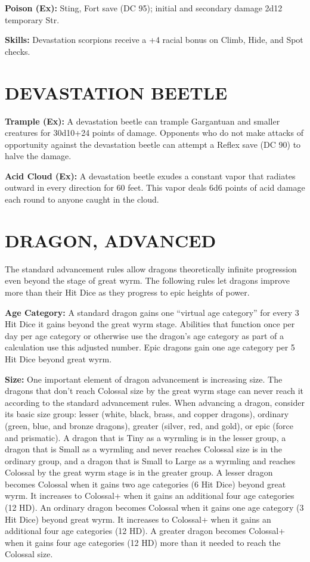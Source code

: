 \documentclass{article}
\begin{document}
\textbf{Poison (Ex):} Sting, Fort save (DC 95); initial and secondary damage 2d12 
temporary Str. 

\textbf{Skills:} Devastation scorpions receive a +4 racial bonus on Climb, Hide, 
and Spot checks. 

\section*{DEVASTATION BEETLE }

\textbf{Trample (Ex):} A devastation beetle can trample Gargantuan and smaller 
creatures for 30d10+24 points of damage. Opponents who do not make attacks of opportunity 
against the devastation beetle can attempt a Reflex save (DC 90) to halve the damage. 

\textbf{Acid Cloud (Ex):} A devastation beetle exudes a constant vapor that radiates 
outward in every direction for 60 feet. This vapor deals 6d6 points of acid damage 
each round to anyone caught in the cloud.

\vspace{12pt}
\section*{{\LARGE{}DRAGON, ADVANCED }}

The standard advancement rules allow dragons theoretically infinite progression 
even beyond the stage of great wyrm. The following rules let dragons improve more 
than their Hit Dice as they progress to epic heights of power. 

\vspace{12pt}
\textbf{Age Category:} A standard dragon gains one ``virtual age category'' for 
every 3 Hit Dice it gains beyond the great wyrm stage. Abilities that function 
once per day per age category or otherwise use the dragon's age category as part 
of a calculation use this adjusted number. Epic dragons gain one age category per 
5 Hit Dice beyond great wyrm. 

\vspace{12pt}
\textbf{Size: }One important element of dragon advancement is increasing size. 
The dragons that don't reach Colossal size by the great wyrm stage can never reach 
it according to the standard advancement rules. When advancing a dragon, consider 
its basic size group: lesser (white, black, brass, and copper dragons), ordinary 
(green, blue, and bronze dragons), greater (silver, red, and gold), or epic (force 
and prismatic). A dragon that is Tiny as a wyrmling is in the lesser group, a dragon 
that is Small as a wyrmling and never reaches Colossal size is in the ordinary 
group, and a dragon that is Small to Large as a wyrmling and reaches Colossal by 
the great wyrm stage is in the greater group. A lesser dragon becomes Colossal 
when it gains two age categories (6 Hit Dice) beyond great wyrm. It increases to 
Colossal+ when it gains an additional four age categories (12 HD). An ordinary 
dragon becomes Colossal when it gains one age category (3 Hit Dice) beyond great 
wyrm. It increases to Colossal+ when it gains an additional four age categories 
(12 HD). A greater dragon becomes Colossal+ when it gains four age categories (12 
HD) more than it needed to reach the Colossal size. 
\end{document}
